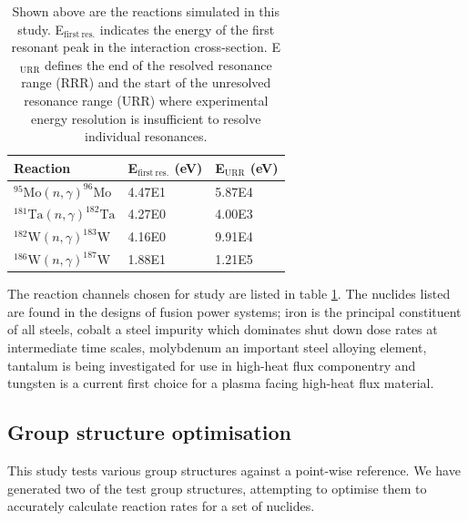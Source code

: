 \begin{table}[h]
  \label{tab:reactions}
  \centering
  \begin{tabular}{lll}
    \toprule
    Reaction                                       & E$_\mathrm{first\ res.}$ (eV) & E$_\mathrm{URR}$ (eV) \\ 
    \midrule
    $^{95}\mathrm{Mo}(n,\gamma)^{96}\mathrm{Mo}$   & 4.47E1                        & 5.87E4                \\
    $^{181}\mathrm{Ta}(n,\gamma)^{182}\mathrm{Ta}$ & 4.27E0                        & 4.00E3                \\
    $^{182}\mathrm{W}(n,\gamma)^{183}\mathrm{W}$   & 4.16E0                        & 9.91E4                \\
    $^{186}\mathrm{W}(n,\gamma)^{187}\mathrm{W}$   & 1.88E1                        & 1.21E5                \\ 
    \bottomrule
  \end{tabular}
  \caption{Shown above are the reactions simulated in this study. E$_\mathrm{first\ res.}$ indicates the energy of the first resonant peak in the interaction cross-section. E$_\mathrm{URR}$ defines the end of the resolved resonance range (RRR) and the start of the unresolved resonance range (URR) where experimental energy resolution is insufficient to resolve individual resonances.}
\end{table}

The reaction channels chosen for study are listed in table \ref{tab:reactions}. The nuclides listed are found in the designs of fusion power systems; iron is the principal constituent of all steels, cobalt a steel impurity which dominates shut down dose rates at intermediate time scales, molybdenum an important steel alloying element, tantalum is being investigated for use in high-heat flux componentry and tungsten is a current first choice for a plasma facing high-heat flux material.

\subsection{Group structure optimisation}
\label{sec:opt}

This study tests various group structures against a point-wise reference. We have generated two of the test group structures, attempting to optimise them to accurately calculate reaction rates for a set of nuclides.

